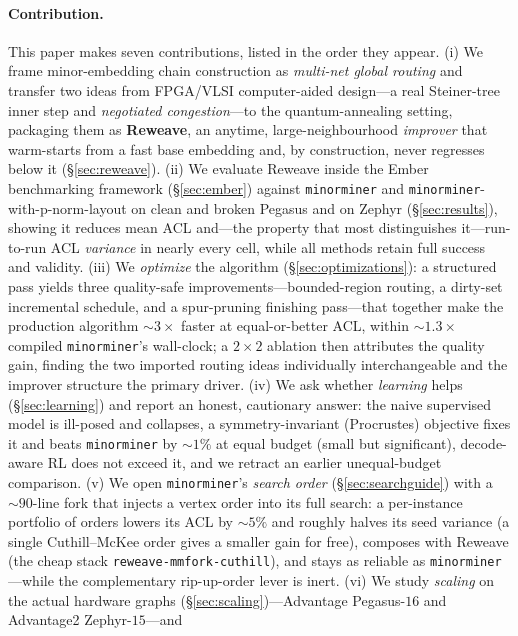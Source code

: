 \documentclass[acmsmall,anonymous,nonacm]{acmart}
\begin{document}
\paragraph{Contribution.}
This paper makes seven contributions, listed in the order they appear.
(i) We frame minor-embedding chain construction as \emph{multi-net global
routing} and transfer two ideas from FPGA/VLSI computer-aided design---a real
Steiner-tree inner step and \emph{negotiated congestion}---to the
quantum-annealing setting, packaging them as \textbf{Reweave}, an anytime,
large-neighbourhood \emph{improver} that warm-starts from a fast base embedding
and, by construction, never regresses below it (\S\ref{sec:reweave}).
(ii) We evaluate Reweave inside the Ember benchmarking framework
(\S\ref{sec:ember}) against \texttt{minorminer} and
\texttt{minorminer}-with-p-norm-layout on clean and broken Pegasus and on Zephyr
(\S\ref{sec:results}), showing it reduces mean ACL and---the property that most
distinguishes it---run-to-run ACL \emph{variance} in nearly every cell, while all
methods retain full success and validity.
(iii) We \emph{optimize} the algorithm (\S\ref{sec:optimizations}): a structured
pass yields three quality-safe improvements---bounded-region routing, a dirty-set
incremental schedule, and a spur-pruning finishing pass---that together make the
production algorithm ${\sim}3\times$ faster at equal-or-better ACL, within
${\sim}1.3\times$ compiled \texttt{minorminer}'s wall-clock; a $2{\times}2$
ablation then attributes the quality gain, finding the two imported routing ideas
individually interchangeable and the improver structure the primary driver.
(iv) We ask whether \emph{learning} helps (\S\ref{sec:learning}) and report an
honest, cautionary answer: the naive supervised model is ill-posed and collapses,
a symmetry-invariant (Procrustes) objective fixes it and beats \texttt{minorminer}
by ${\sim}1\%$ at equal budget (small but significant), decode-aware RL does not
exceed it, and we retract an earlier unequal-budget comparison.
(v) We open \texttt{minorminer}'s \emph{search order}
(\S\ref{sec:searchguide}) with a ${\sim}90$-line fork that injects a vertex order
into its full search: a per-instance portfolio of orders lowers its ACL by
${\sim}5\%$ and roughly halves its seed variance (a single Cuthill--McKee order
gives a smaller gain for free), composes with Reweave
(the cheap stack \texttt{reweave-mmfork-cuthill}), and stays as reliable as
\texttt{minorminer}---while the complementary rip-up-order lever is inert.
(vi) We study \emph{scaling} on the actual hardware graphs
(\S\ref{sec:scaling})---Advantage Pegasus-$16$ and Advantage2 Zephyr-$15$---and
\end{document}
